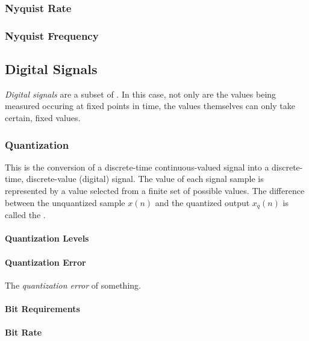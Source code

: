 \subsubsection{Nyquist Rate}\label{subsubsec:Nyquist Rate}
\subsubsection{Nyquist Frequency}\label{subsubsec:Nyquist Frequency}

\subsection{Digital Signals}\label{subsec:Digital Signals}
\begin{definition}\label{def:Digital Signals}
  \emph{Digital signals} are a subset of .
  In this case, not only are the values being measured occuring at fixed points in time, the values themselves can only take certain, fixed values.
\end{definition}

\subsubsection{Quantization}\label{subsubsec:Quantization}
\begin{definition}[Quantization]\label{def:Quantization}
  This is the conversion of a discrete-time continuous-valued signal into a discrete-time, discrete-value (digital) signal.
  The value of each signal sample is represented by a value selected from a finite set of possible values.
  The difference between the unquantized sample $x(n)$ and the quantized output $x_{q}(n)$ is called the .
\end{definition}

\paragraph{Quantization Levels}\label{par:Quantization Levels}
\paragraph{Quantization Error}\label{par:Quantization Error}
\begin{definition}\label{def:Quantization Error}
  The \emph{quantization error} of something.
\end{definition}

\paragraph{Bit Requirements}\label{par:Quantization Bit Requirements}
\paragraph{Bit Rate}\label{par:Quantization Bit Rate}
